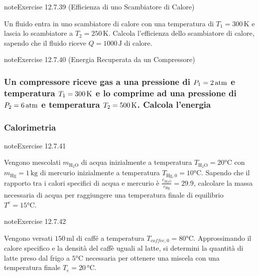 \documentclass[letterpaper,10pt,italian]{jupyterBook}
\begin{document}
\begin{sphinxadmonition}{note}{Exercise 12.7.39 (Efficienza di uno Scambiatore di Calore)}



\sphinxAtStartPar
Un fluido entra in uno scambiatore di calore con una temperatura di \(T_1 = 300 \, \text{K}\) e lascia lo scambiatore a \(T_2 = 250 \, \text{K}\). Calcola l’efficienza dello scambiatore di calore, sapendo che il fluido riceve \(Q = 1000 \, \text{J}\) di calore.
\end{sphinxadmonition}
 \label{exercise:ch/thermodynamics/principles-problems-exercise-39}

\begin{sphinxadmonition}{note}{Exercise 12.7.40 (Energia Recuperata da un Compressore)}


\subsubsection*{Un compressore riceve gas a una pressione di \protect\(P_1 = 2 \, \text{atm}\protect\) e temperatura \protect\(T_1 = 300 \, \text{K}\protect\) e lo comprime ad una pressione di \protect\(P_2 = 6 \, \text{atm}\protect\) e temperatura \protect\(T_2 = 500 \, \text{K}\protect\). Calcola l’energia}
\subsubsection*{Calorimetria}
 \label{exercise:ch/thermodynamics/principles-problems-exercise-40}

\begin{sphinxadmonition}{note}{Exercise 12.7.41}



\sphinxAtStartPar
Vengono mescolati \(m_{\text{H}_2\text{O}}\) di acqua inizialmente a temperatura \(T_{\text{H}_2\text{O}} = 20 \text{°C}\) con \(m_{\text{Hg}} = 1 \, \text{kg}\) di mercurio inizialmente a temperatura \(T_{\text{Hg},0} = 10 \text{°C}\). Sapendo che il rapporto tra i calori specifici di acqua e mercurio è \(\frac{c_{H_2 O}}{c_{\text{Hg}}} = 29.9\), calcolare la massa necessaria di acqua per raggiungere una temperatura finale di equilibrio \(T^{e} = 15 \text{°C}\).
\end{sphinxadmonition}
\end{sphinxadmonition}
 \label{exercise:ch/thermodynamics/principles-problems-exercise-41}

\begin{sphinxadmonition}{note}{Exercise 12.7.42}



\sphinxAtStartPar
Vengono versati \(150 \, \text{ml}\) di caffé a temperatura \(T_{coffee,0} = 80 \text{°C}\). Approssimando il calore specifico e la densità del caffè uguali al latte, si determini la quantità di latte preso dal frigo a \(5 \text{°C}\) necessaria per ottenere una miscela con una temperatura finale \(T_e = 20 \, \text{°C}\).
\end{sphinxadmonition}
 \label{exercise:ch/thermodynamics/principles-problems-exercise-42}
\end{document}
